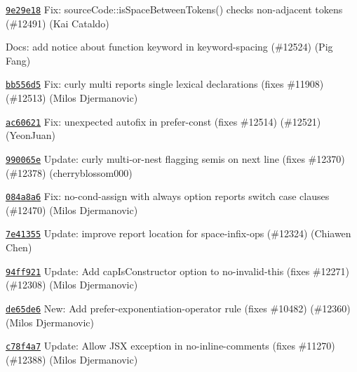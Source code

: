 \begin{DoxyItemize}
\item \href{https://github.com/eslint/eslint/commit/9e29e189752f06362fd1956659e07834efb746a5}{\texttt{ {\ttfamily 9e29e18}}} Fix\+: source\+Code\+::is\+Space\+Between\+Tokens() checks non-\/adjacent tokens (\#12491) (Kai Cataldo)
\item \href{https://github.com/eslint/eslint/commit/586855060afb3201f4752be8820dc85703b523a6}{\texttt{ {}}} Docs\+: add notice about {\ttfamily function} keyword in keyword-\/spacing (\#12524) (Pig Fang)
\item \href{https://github.com/eslint/eslint/commit/bb556d5fd735ad2dcea322082edcc07a58105ce9}{\texttt{ {\ttfamily bb556d5}}} Fix\+: curly {\ttfamily multi} reports single lexical declarations (fixes \#11908) (\#12513) (Milos Djermanovic)
\item \href{https://github.com/eslint/eslint/commit/ac606217d4beebc35b865d14a7f9723fd21faa48}{\texttt{ {\ttfamily ac60621}}} Fix\+: unexpected autofix in prefer-\/const (fixes \#12514) (\#12521) (Yeon\+Juan)
\item \href{https://github.com/eslint/eslint/commit/990065e5f58b6cc6922ab6cee5b97bfc56a6237a}{\texttt{ {\ttfamily 990065e}}} Update\+: curly multi-\/or-\/nest flagging semis on next line (fixes \#12370) (\#12378) (cherryblossom000)
\item \href{https://github.com/eslint/eslint/commit/084a8a63a749232681fefe9bdac6802efdcdc8a8}{\texttt{ {\ttfamily 084a8a6}}} Fix\+: no-\/cond-\/assign with {\ttfamily always} option reports switch case clauses (\#12470) (Milos Djermanovic)
\item \href{https://github.com/eslint/eslint/commit/7e41355b19a8ef347620dd7c0dde491c3460937b}{\texttt{ {\ttfamily 7e41355}}} Update\+: improve report location for space-\/infix-\/ops (\#12324) (Chiawen Chen)
\item \href{https://github.com/eslint/eslint/commit/94ff921689115f856578159564ee1968b4b914be}{\texttt{ {\ttfamily 94ff921}}} Update\+: Add cap\+Is\+Constructor option to no-\/invalid-\/this (fixes \#12271) (\#12308) (Milos Djermanovic)
\item \href{https://github.com/eslint/eslint/commit/de65de6e488112a602949e6a5d27dd4c754b003c}{\texttt{ {\ttfamily de65de6}}} New\+: Add prefer-\/exponentiation-\/operator rule (fixes \#10482) (\#12360) (Milos Djermanovic)
\item \href{https://github.com/eslint/eslint/commit/c78f4a73de68f81cd41132b46d4840b91599d599}{\texttt{ {\ttfamily c78f4a7}}} Update\+: Allow J\+SX exception in no-\/inline-\/comments (fixes \#11270) (\#12388) (Milos Djermanovic)

\end{DoxyItemize}
